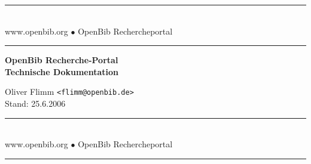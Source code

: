 \documentclass[11pt, twoside, a4paper, BCOR8mm, DIV12, bibtotoc,idxtotoc]{scrbook}
\begin{document}
\frontmatter

\begin{titlepage}

\begin{center}
\rule[-.1in]{16cm}{1mm}\\[3mm]
{\fontsize{20}{20pt}\selectfont
  www.openbib.org $\bullet$ OpenBib Rechercheportal}\\[-2mm]
\rule[-.1in]{16cm}{1mm}

\vspace{5cm}

  \textbf{\fontsize{30}{30pt}\selectfont OpenBib Recherche-Portal\\[3mm] Technische Dokumentation}

  \vspace{2cm}

  Oliver Flimm \texttt{<flimm@openbib.de>}\\
  Stand: 25.6.2006

  \vspace{8cm}

\rule[-.1in]{16cm}{1mm}\\[3mm]
{\fontsize{20}{20pt}\selectfont
  www.openbib.org $\bullet$ OpenBib Rechercheportal}\\[-2mm]
\rule[-.1in]{16cm}{1mm}

\end{center}

\end{titlepage}






\tableofcontents
\end{document}
